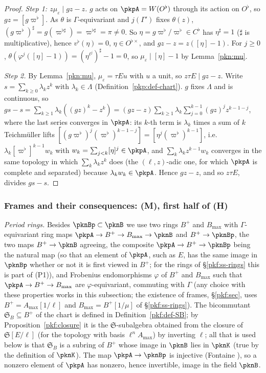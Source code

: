 \documentclass[10pt]{amsart}
\theoremstyle{definition}
\theoremstyle{remark}
\begin{document}
\begin{proof}
\emph{Step 1: $z\mu_\varepsilon\mid gz-z$.} $g$ acts on $\pkpA=W(O^\flat)$ through its action on
$O^\flat$, so $gz=[g\varpi^\flat]$. As $\theta$ is $\Gamma$-equivariant and $j(\Gamma')$ fixes
$\theta(z)$, $(g\varpi^\flat)^\sharp=g(\varpi^{\flat\sharp})=\varpi^{\flat\sharp}=\pi\ne0$. So $\eta=
g\varpi^\flat/\varpi^\flat\in C^\flat$ has $\eta^\sharp=1$ ($\sharp$ is multiplicative), hence
$v^\flat(\eta)=0$, $\eta\in O^{\flat\times}$, and $gz-z=z([\eta]-1)$. For $j\ge0$,
$\theta(\varphi^j([\eta]-1))=(\eta^{\ell^j})^\sharp-1=0$, so $\mu_\varepsilon\mid[\eta]-1$ by
Lemma~\ref{pkn:mu}.

\emph{Step 2.} By Lemma~\ref{pkn:mu}, $\mu_\varepsilon=\tau Eu$ with $u$ a unit, so $z\tau E\mid gz-z$.
Write $s=\sum_{k\ge0}\lambda_kz^k$ with $\lambda_k\in\Lambda$ (Definition~\ref{pkp:def-chart}). $g$ fixes
$\Lambda$ and is continuous, so $gs-s=\sum_{k\ge1}\lambda_k((gz)^k-z^k)=(gz-z)\sum_{k\ge1}\lambda_k
\sum_{j=0}^{k-1}(gz)^jz^{k-1-j}$, where the last series converges in $\pkpA$: its $k$-th term is
$\lambda_k$ times a sum of $k$ Teichm\"uller lifts $[(g\varpi^\flat)^j(\varpi^\flat)^{k-1-j}]=[\eta^j
(\varpi^\flat)^{k-1}]$, i.e.\ $\lambda_k[\varpi^\flat]^{k-1}w_k$ with $w_k=\sum_{j<k}[\eta]^j\in\pkpA$, and
$\sum_k\lambda_kz^{k-1}w_k$ converges in the same topology in which $\sum_k\lambda_kz^k$ does (the
$(\ell,z)$-adic one, for which $\pkpA$ is complete and separated) because $\lambda_kw_k\in\pkpA$. Hence
$gz-z$, and so $z\tau E$, divides $gs-s$.
\end{proof}

\subsubsection{Frames and their consequences: (M), first half of (H)}\label{pkn:ss-frame}

\emph{Period rings.} Besides $\pknBp\subset\pknB$ we use two rings $B^+$ and $B_{\max}$ with
$\Gamma$-equivariant ring maps $\pkpA\to B^+\to B_{\max}\to\pknB$ and $B^+\to\pknBp$, the two maps
$B^+\to\pknB$ agreeing, the composite $\pkpA\to B^+\to\pknBp$ being the natural map (so that an element of $\pkpA$, such as $E$, has the same image in $\pknBp$ whether or not it is first viewed in $B^+$; for the rings of \S\ref{pkf:ss-rings} this is part of (P1)), and Frobenius endomorphisms $\varphi$ of $B^+$ and $B_{\max}$ such that
$\pkpA\to B^+\to B_{\max}$ are $\varphi$-equivariant, commuting with $\Gamma$ (any choice with these properties works in this subsection; the existence of frames,
\S\ref{pkf:sec}, uses $B^+=A_{\max}[1/\ell]$ and $B_{\max}=B^+[1/\mu]$ of \S\ref{pkf:ss-rings}). The
bicommutant $\mathfrak S_B\subseteq B^+$ of the chart is defined in Definition~\ref{pkf:def-SB}; by
Proposition~\ref{pkf:closure} it is the $\mathfrak S$-subalgebra obtained from the closure of
$\mathfrak S[E/\ell]$ (for the topology with basis $\ell^nA_{\max}$) by inverting $\ell$; all
that is used below is that $\mathfrak S_B$ is a subring of $B^+$ whose image in $\pknB$ lies in
$\pknK$ (true by the definition of $\pknK$). The map $\pkpA\to\pknBp$ is injective (Fontaine \cite[4.1.1]{pkfFontaineII}), so a nonzero element of $\pkpA$ has nonzero, hence invertible, image in the field
$\pknB$.
\end{document}
